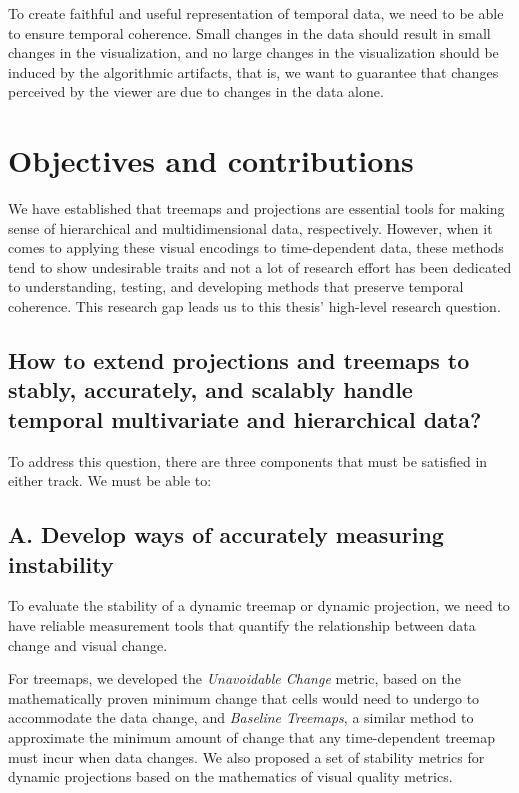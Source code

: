 To create faithful and useful representation of temporal data, we need to be able to ensure temporal coherence. Small changes in the data should result in small changes in the visualization, and no large changes in the visualization should be induced by the algorithmic artifacts, that is, we want to guarantee that changes perceived by the viewer are due to changes in the data alone.


\section{Objectives and contributions}

We have established that treemaps and projections are essential tools for making sense of hierarchical and multidimensional data, respectively. However, when it comes to applying these visual encodings to time-dependent data, these methods tend to show undesirable traits and not a lot of research effort has been dedicated to understanding, testing, and developing methods that preserve temporal coherence. This research gap leads us to this thesis' high-level research question.

\subsection*{How to extend projections and treemaps to stably, accurately, and scalably handle temporal multivariate and hierarchical data?}

To address this question, there are three components that must be satisfied in either track. We must be able to:

\subsection*{A. Develop ways of accurately measuring instability}

To evaluate the stability of a dynamic treemap or dynamic projection, we need to have reliable measurement tools that quantify the relationship between data change and visual change.

For treemaps, we developed the \emph{Unavoidable Change} metric, based on the mathematically proven minimum change that cells would need to undergo to accommodate the data change, and \emph{Baseline Treemaps}, a similar method to approximate the minimum amount of change that any time-dependent treemap must incur when data changes. We also proposed a set of stability metrics for dynamic projections based on the mathematics of visual quality metrics.

